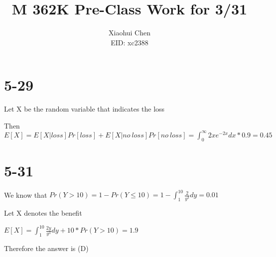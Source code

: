 \documentclass[12pt]{article}
\author{Xiaohui Chen \\EID: xc2388}
\title{M 362K Pre-Class Work for 3/31}
\begin{document}
\maketitle
\begin{spacing}{2.0}

\section*{5-29}

Let X be the random variable that indicates the loss

Then $E[X]= E[X|loss]Pr[loss]+ E[X|no\ loss]Pr[no\ loss]= \int_{0}^{\infty} 2xe^{-2x} dx *0.9 = 0.45$

\section*{5-31}

We know that $Pr(Y>10) = 1- Pr(Y \le 10) = 1- \int_{1}^{10} \frac{2}{y^3} dy = 0.01$

Let X denotes the benefit

$E[X]= \int_{1}^{10} \frac{2y}{y^3} dy + 10*Pr(Y>10) = 1.9$

Therefore the answer is (D)

\end{spacing}
\end{document}
